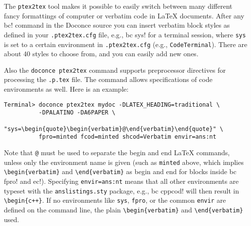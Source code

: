 \documentclass[%
oneside,                 %
final,                   %
10pt]{article}
\begin{document}
{{{{\noindent
The {\fontsize{10pt}{10pt}\Verb!ptex2tex!} tool makes it possible to easily switch between many
different fancy formattings of computer or verbatim code in {\LaTeX}
documents. After any {\fontsize{10pt}{10pt}\Verb!!bc!} command in the Doconce source you can
insert verbatim block styles as defined in your {\fontsize{10pt}{10pt}\Verb!.ptex2tex.cfg!}
file, e.g., {\fontsize{10pt}{10pt}\Verb!!bc sys!} for a terminal session, where {\fontsize{10pt}{10pt}\Verb!sys!} is set to
a certain environment in {\fontsize{10pt}{10pt}\Verb!.ptex2tex.cfg!} (e.g., {\fontsize{10pt}{10pt}\Verb!CodeTerminal!}).
There are about 40 styles to choose from, and you can easily add
new ones.

Also the {\fontsize{10pt}{10pt}\Verb!doconce ptex2tex!} command supports preprocessor directives
for processing the {\fontsize{10pt}{10pt}\Verb!.p.tex!} file. The command allows specifications
of code environments as well. Here is an example:
\vspace{4pt}
\begin{Verbatim}[numbers=none,frame=lines,label=\fbox{{\tiny Terminal}},fontsize=\fontsize{9pt}{9pt},
labelposition=topline,framesep=2.5mm,framerule=0.7pt]
Terminal> doconce ptex2tex mydoc -DLATEX_HEADING=traditional \
          -DPALATINO -DA6PAPER \
          "sys=\begin{quote}\begin{verbatim}@\end{verbatim}\end{quote}" \
          fpro=minted fcod=minted shcod=Verbatim envir=ans:nt
\end{Verbatim}
Note that {\fontsize{10pt}{10pt}\Verb!@!} must be used to separate the begin and end {\LaTeX}
commands, unless only the environment name is given (such as {\fontsize{10pt}{10pt}\Verb!minted!}
above, which implies {\fontsize{10pt}{10pt}\Verb!\begin{verbatim}!} and {\fontsize{10pt}{10pt}\Verb!\end{verbatim}!} as
begin and end for blocks inside {\fontsize{10pt}{10pt}\Verb!!bc fpro!} and {\fontsize{10pt}{10pt}\Verb!!ec!}).  Specifying
{\fontsize{10pt}{10pt}\Verb!envir=ans:nt!} means that all other environments are typeset with the
{\fontsize{10pt}{10pt}\Verb!anslistings.sty!} package, e.g., {\fontsize{10pt}{10pt}\Verb!!bc cppcod!} will then result in
{\fontsize{10pt}{10pt}\Verb!\begin{c++}!}. If no environments like {\fontsize{10pt}{10pt}\Verb!sys!}, {\fontsize{10pt}{10pt}\Verb!fpro!}, or the common
{\fontsize{10pt}{10pt}\Verb!envir!} are defined on the command line, the plain {\fontsize{10pt}{10pt}\Verb!\begin{verbatim}!}
and {\fontsize{10pt}{10pt}\Verb!\end{verbatim}!} used.


}}}}
\end{document}
